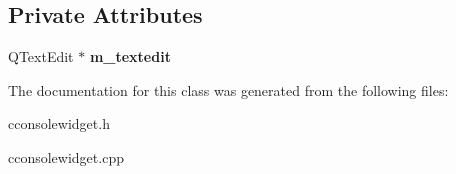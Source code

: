 \subsection*{Private Attributes}
\begin{DoxyCompactItemize}
\item 
\mbox{\label{class_c_console_widget_ad2198f5dc2a5f703da7b7b73b9326e94}} 
Q\+Text\+Edit $\ast$ {\bfseries m\+\_\+textedit}
\end{DoxyCompactItemize}


The documentation for this class was generated from the following files\+:\begin{DoxyCompactItemize}
\item 
cconsolewidget.\+h\item 
cconsolewidget.\+cpp\end{DoxyCompactItemize}
